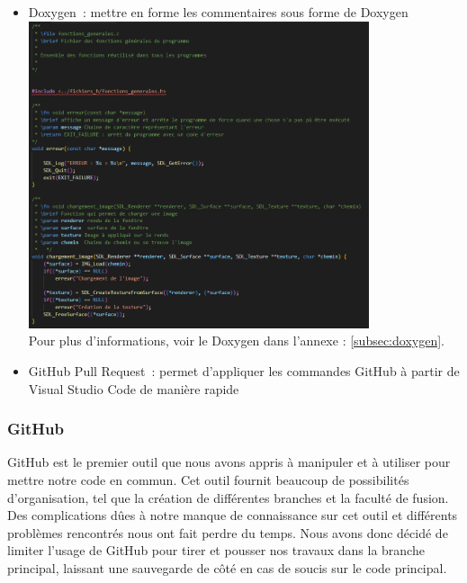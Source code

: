 \documentclass[12pt,a4paper]{article}
\begin{document}
                \begin{itemize}
                    \item Doxygen~: mettre en forme les commentaires sous forme de Doxygen\\

                    \includegraphics[width=10cm]{images/doxygen.png}\\

                    Pour plus d'informations, voir le Doxygen dans l'annexe : \ref{subsec:doxygen}.\\
                    
                    \item GitHub Pull Request~: permet d’appliquer les commandes GitHub à partir de Visual Studio Code de manière rapide
                \end{itemize}
                
            \subsubsection{GitHub}
                \tabto{1cm} GitHub est le premier outil que nous avons appris à manipuler et à utiliser pour mettre notre code en commun. Cet outil fournit beaucoup de possibilités d’organisation, tel que la création de différentes branches et la faculté de fusion. Des complications dûes à notre manque de connaissance sur cet outil et différents problèmes rencontrés nous ont fait perdre du temps. Nous avons donc décidé de limiter l’usage de GitHub pour tirer et pousser nos travaux dans la branche principal, laissant une sauvegarde de côté en cas de soucis sur le code principal.
\end{document}
